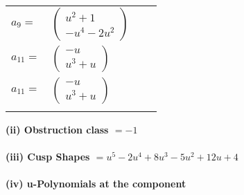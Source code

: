 \documentclass[1p]{elsarticle_modified}
\theoremstyle{definition}
\begin{document}
\begin{tabular}{m{7pt} m{180pt} m{7pt} m{180pt} }
\flushright $a_{9}=$&$\begin{pmatrix}u^2+1\\- u^4-2 u^2\end{pmatrix}$ \\
\flushright $a_{11}=$&$\begin{pmatrix}- u\\u^3+u\end{pmatrix}$\\ \flushright $a_{11}=$&$\begin{pmatrix}- u\\u^3+u\end{pmatrix}$\\&\end{tabular}
\flushleft \textbf{(ii) Obstruction class $= -1$}\\~\\
\flushleft \textbf{(iii) Cusp Shapes $= u^5-2 u^4+8 u^3-5 u^2+12 u+4$}\\~\\
\newpage\renewcommand{\arraystretch}{1}
\flushleft \textbf{(iv) u-Polynomials at the component}\newline \\
\end{document}
